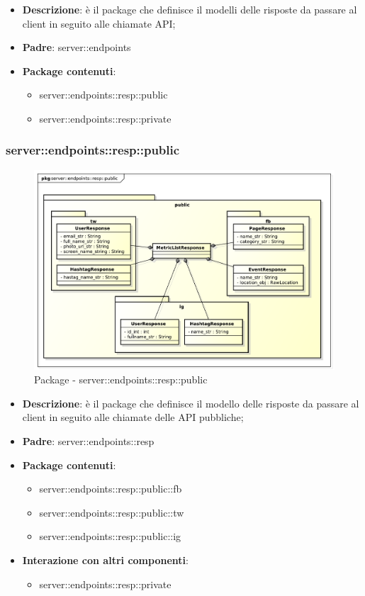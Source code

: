 \begin{itemize}
  \item \textbf{Descrizione}: è il package che definisce il modelli delle risposte da passare al client in seguito alle chiamate API;
  \item \textbf{Padre}: server::endpoints
  \item \textbf{Package contenuti}:
  	\begin{itemize}
  		\item server::endpoints::resp::public
  		\item server::endpoints::resp::private
	\end{itemize}
\end{itemize}

\subsubsection{server::endpoints::resp::public} %
\label{ssub:bdsm_app_server_endpoints_resp_public}
\begin{figure}[!htbp]
	\centering
	\centerline{\includegraphics[scale=0.55]{./images/server/resp_public.pdf}}
	\caption{Package - server::endpoints::resp::public}
\end{figure}

\begin{itemize}
  \item \textbf{Descrizione}: è il package che definisce il modello delle risposte da passare al client in seguito alle chiamate delle API pubbliche;
  \item \textbf{Padre}: server::endpoints::resp
  \item \textbf{Package contenuti}:
  	\begin{itemize}
  		\item server::endpoints::resp::public::fb
  		\item server::endpoints::resp::public::tw
  		\item server::endpoints::resp::public::ig
	\end{itemize}
  \item \textbf{Interazione con altri componenti}:
  	\begin{itemize}
  		\item server::endpoints::resp::private
	\end{itemize}
\end{itemize}

